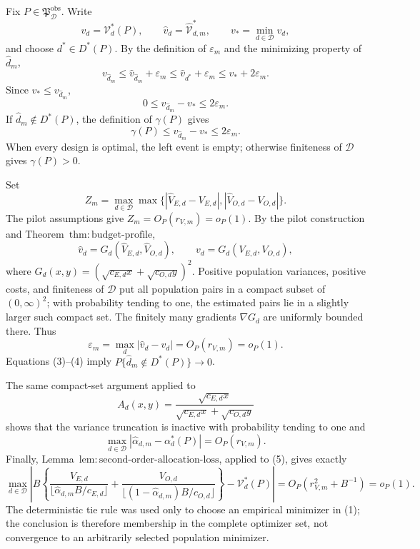 Fix \(P\in\mathfrak P_{\mathcal D}^{\mathrm{obs}}\).  Write
\[
 v_d=\mathcal V_d^*(P),\qquad
 \widehat v_d=\widehat{\mathcal V}_{d,m}^*,
 \qquad v_*=\min_{d\in\mathcal D}v_d,
\]
and choose \(d^*\in D^*(P)\).  By the definition of \(\varepsilon_m\) and the minimizing property of \(\widehat d_m\),
\[
 v_{\widehat d_m}
 \le \widehat v_{\widehat d_m}+\varepsilon_m
 \le \widehat v_{d^*}+\varepsilon_m
 \le v_*+2\varepsilon_m. \tag{1}
\]
Since \(v_*\le v_{\widehat d_m}\),
\[
 0\le v_{\widehat d_m}-v_*\le2\varepsilon_m. \tag{2}
\]
If \(\widehat d_m\notin D^*(P)\), the definition of \(\gamma(P)\) gives
\[
 \gamma(P)\le v_{\widehat d_m}-v_*\le2\varepsilon_m. \tag{3}
\]
When every design is optimal, the left event is empty; otherwise finiteness of \(\mathcal D\) gives \(\gamma(P)>0\).

Set
\[
 Z_m=\max_{d\in\mathcal D}\max\{|\widehat V_{E,d}-V_{E,d}|,
 |\widehat V_{O,d}-V_{O,d}|\}.
\]
The pilot assumptions give \(Z_m=O_P(r_{V,m})=o_P(1)\).  By the pilot construction and Theorem~\(\mathrm{thm{:}budget\text{-}profile}\),
\[
 \widehat v_d=G_d(\widehat V_{E,d},\widehat V_{O,d}),
 \qquad v_d=G_d(V_{E,d},V_{O,d}),
\]
where \(G_d(x,y)=(\sqrt{c_{E,d}x}+\sqrt{c_{O,d}y})^2\).  Positive population variances, positive costs, and finiteness of \(\mathcal D\) put all population pairs in a compact subset of \((0,\infty)^2\); with probability tending to one, the estimated pairs lie in a slightly larger such compact set.  The finitely many gradients \(\nabla G_d\) are uniformly bounded there.  Thus
\[
 \varepsilon_m=\max_d|\widehat v_d-v_d|=O_P(r_{V,m})=o_P(1). \tag{4}
\]
Equations (3)--(4) imply \(P\{\widehat d_m\notin D^*(P)\}\to0\).

The same compact-set argument applied to
\[
 A_d(x,y)=\frac{\sqrt{c_{E,d}x}}
 {\sqrt{c_{E,d}x}+\sqrt{c_{O,d}y}}
\]
shows that the variance truncation is inactive with probability tending to one and
\[
 \max_{d\in\mathcal D}|\widehat\alpha_{d,m}-\alpha_d^*(P)|
 =O_P(r_{V,m}). \tag{5}
\]
Finally, Lemma~\(\mathrm{lem{:}second\text{-}order\text{-}allocation\text{-}loss}\), applied to (5), gives exactly
\[
\max_{d\in\mathcal D}\left|B\left\{
\frac{V_{E,d}}{\lfloor\widehat\alpha_{d,m}B/c_{E,d}\rfloor}
+\frac{V_{O,d}}{\lfloor(1-\widehat\alpha_{d,m})B/c_{O,d}\rfloor}
\right\}-\mathcal V_d^*(P)\right|
=O_P(r_{V,m}^2+B^{-1})=o_P(1).
\]
The deterministic tie rule was used only to choose an empirical minimizer in (1); the conclusion is therefore membership in the complete optimizer set, not convergence to an arbitrarily selected population minimizer.